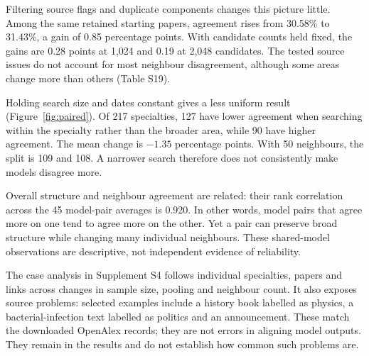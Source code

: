 \documentclass[12pt]{article}
\begin{document}
Filtering source flags and duplicate components changes this picture little. Among the same retained starting papers, agreement rises from 30.58\% to 31.43\%, a gain of 0.85 percentage points. With candidate counts held fixed, the gains are 0.28 points at 1,024 and 0.19 at 2,048 candidates. The tested source issues do not account for most neighbour disagreement, although some areas change more than others (Table S19).

Holding search size and dates constant gives a less uniform result (Figure~\ref{fig:paired}). Of 217 specialties, 127 have lower agreement when searching within the specialty rather than the broader area, while 90 have higher agreement. The mean change is $-1.35$ percentage points. With 50 neighbours, the split is 109 and 108. A narrower search therefore does not consistently make models disagree more.

Overall structure and neighbour agreement are related: their rank correlation across the 45 model-pair averages is 0.920. In other words, model pairs that agree more on one tend to agree more on the other. Yet a pair can preserve broad structure while changing many individual neighbours. These shared-model observations are descriptive, not independent evidence of reliability.

The case analysis in Supplement S4 follows individual specialties, papers and links across changes in sample size, pooling and neighbour count. It also exposes source problems: selected examples include a history book labelled as physics, a bacterial-infection text labelled as politics and an announcement. These match the downloaded OpenAlex records; they are not errors in aligning model outputs. They remain in the results and do not establish how common such problems are.

\FloatBarrier
\end{document}
